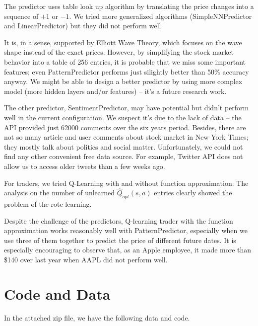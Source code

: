 \documentclass[twocolumn,10pt]{asme2ej}
\begin{document}
The predictor uses table look up algorithm by translating the price
changes into a sequence of $+1$ or $-1$. We tried more generalized
algorithms (SimpleNNPredictor and LinearPredictor) but
they did not perform well.

It is, in a sense, supported by Elliott Wave Theory, which focuses on
the wave shape instead of the exact prices. However, by simplifying
the stock market behavior into a table of 256 entries, it is probable
that we miss some important features; even PatternPredictor
performs just silightly better than 50\% accuracy anyway. We might be
able to design a better predictor by using more complex model (more
hidden layers and/or features) -- it's a future research work.

The other predictor, SentimentPredictor, may have potential but
didn't perform well in the current configuration. We suspect it's due
to the lack of data -- the API provided just 62000 comments over the
six years period. Besides, there are not so many article and user
comments about stock market in New York Times; they mostly talk about
politics and social matter. Unfortunately, we could not find any other
convenient free data source. For example, Twitter API does not allow
us to access older tweets than a few weeks ago.

For traders, we tried Q-Learning with and without function
approximation. The analysis on the number of unlearned
$\hat{Q}_{opt}(s,a)$ entries clearly showed the problem of the rote
learning.

Despite the challenge of the predictors, Q-learning trader with the
function approximation works reasonably well with PatternPredictor,
especially when we use three of them together to predict the price of
different future dates. It is especially encouraging to observe that,
as an Apple employee, it made more than \$140 over last year when AAPL
did not perform well.

\section{Code and Data}

In the attached zip file, we have the following data and code.
\end{document}
